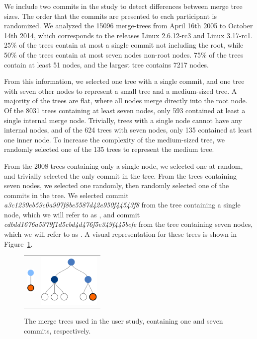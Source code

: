 We include two commits in the study to detect differences between merge
tree sizes. The order that the commits are presented to each participant
is randomized. We analyzed the 15096 merge-trees from April 16th 2005 to
October 14th 2014, which corresponds to the releases Linux 2.6.12-rc3
and Linux 3.17-rc1. 25\% of the trees contain at most a single commit
not including the root, while 50\% of the trees contain at most seven
nodes non-root nodes. 75\% of the trees contain at least 51 nodes, and
the largest tree contains 7217 nodes.

From this information, we selected one tree with a single commit, and
one tree with seven other nodes to represent a small tree and a
medium-sized tree. A majority of the trees are flat, where all nodes
merge directly into the root node. Of the 8031 trees containing at least
seven nodes, only 593 contained at least a single internal merge node.
Trivially, trees with a single node cannot have any internal nodes, and
of the 624 trees with seven nodes, only 135 contained at least one inner
node. To increase the complexity of the medium-sized tree, we randomly
selected one of the 135 trees to represent the medium tree.

From the 2008 trees containing only a single node, we selected one at
random, and trivially selected the only commit in the tree. From the
trees containing seven nodes, we selected one randomly, then randomly
selected one of the commits in the tree. We selected commit
\emph{a3c1239eb59c0a907f8be5587d42e950f44543f8} from the tree containing
a single node, which we will refer to as \comA, and commit
\emph{cdbdd1676a5379f1d5cbd4d476f5e349f445befe} from the tree containing
seven nodes, which we will refer to as \comB. A visual representation
for these trees is shown in Figure~\ref{fig:study_commits}.

\begin{figure}[bpt]
  \centering
  \begin{tabular}{ m{1.5cm} m{3cm} }
    \includegraphics[height=0.5in]{figures/commits/1-commit.pdf} &
    \includegraphics[height=1in]{figures/commits/7-commits.pdf}\\
  \end{tabular}
  \caption{The merge trees used in the user study,
    containing one and seven commits, respectively.}
  \label{fig:study_commits}
\end{figure}

